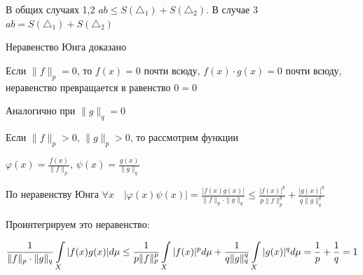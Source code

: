 \documentclass[a4paper]{report}
\newcommand*{\hm}[1]{#1\nobreak\discretionary{}%
            {\hbox{$\mathsurround=0pt #1$}}{}}
\begin{document}
\begin{figure}[h]
\begin{minipage}[h]{0.3\linewidth}
\end{minipage}
\hfill
\begin{minipage}[h]{0.3\linewidth}
\end{minipage}
\end{figure}

В общих случаях 1,2 $ab\le S(\triangle_1)+S(\triangle_2)$. В случае 3 $ab=S(\triangle_1)+S(\triangle_2)$

Неравенство Юнга доказано

Если $\|f\|_p=0$, то $f(x)=0$ почти всюду, $f(x)\cdot g(x)=0$ почти всюду, неравенство превращается в равенство $0=0$

Аналогично при $\|g\|_q=0$

Если $\|f\|_p>0$, $\|g\|_p>0$, то рассмотрим функции

$\varphi(x)=\displaystyle\frac{f(x)}{\|f\|_p}$, $\psi(x)=\displaystyle\frac{g(x)}{\|g\|_q}$

По неравенству Юнга $\forall x\quad|\varphi(x)\psi(x)|=\displaystyle\frac{|f(x)g(x)|}{\|f\|_p\cdot\|g\|_q}\le\displaystyle\frac{|f(x)|^p}{p\|f\|_p^p}+\displaystyle\frac{|g(x)|^q}{q\|g\|_q^q}$

Проинтегрируем это неравенство:

$\displaystyle\frac1{\|f\|_p\cdot\|g\|_q}\displaystyle\int\limits_X|f(x)g(x)|d\mu\le\frac1{p\|f\|_p^p}\displaystyle\int\limits_X|f(x)|^pd\mu+\frac1{q\|g\|_q^q}\displaystyle\int\limits_X|g(x)|^qd\mu=\frac1p\hm+\frac1q=1$
\end{document}
